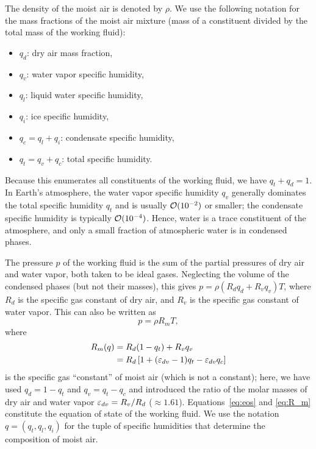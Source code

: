 \documentclass{report}
\begin{document}
The density of the moist air is denoted by $\rho$. We use the following notation for the mass fractions of the moist air mixture (mass of a constituent divided by the total mass of the working fluid):
\begin{itemize}
\item $q_d$: dry air mass fraction,
\item $q_v$: water vapor specific humidity,
\item $q_l$: liquid water specific humidity,
\item $q_i$: ice specific humidity,
\item $q_c = q_l + q_i$: condensate specific humidity,
\item $q_t = q_v + q_c$: total specific humidity.
\end{itemize}
Because this enumerates all constituents of the working fluid, we have $q_t + q_d = 1$. In Earth's atmosphere, the water vapor specific humidity $q_v$ generally dominates the total specific humidity $q_t$ and is usually $\mathcal{O}(10^{-2})$ or smaller; the condensate specific humidity is typically $\mathcal{O}(10^{-4})$. Hence, water is a trace constituent of the atmosphere, and only a small fraction of atmospheric water is in condensed phases. 

The pressure $p$ of the working fluid is the sum of the partial pressures of dry air and water vapor, both taken to be ideal gases. Neglecting the volume of the condensed phases (but not their masses), this gives $p = \rho (R_d q_d + R_v q_v) T$, where $R_d$ is the specific gas constant of dry air, and $R_v$ is the specific gas constant of water vapor. This can also be written as
\begin{equation}
    p = \rho R_m T,
\label{eq:eos}
\end{equation}
where
\begin{equation}
\begin{split}
    R_m(q) & = R_d (1 - q_t) + R_v q_v \\
        & = R_d \left[1 + (\varepsilon_{dv}-1)q_t - \varepsilon_{dv} q_c\right]
\label{eq:R_m}
\end{split}
\end{equation}
is the specific gas ``constant'' of moist air (which is not a constant); here, we have used $q_d = 1-q_t$ and $q_v = q_t - q_c$ and introduced the ratio of the molar masses of dry air and water vapor $\varepsilon_{dv} = R_v/R_d$ ($\approx 1.61$). Equations~\eqref{eq:eos} and \eqref{eq:R_m} constitute the equation of state of the working fluid. We use the notation $q=(q_t, q_l, q_i)$ for the tuple of specific humidities that determine the composition of moist air.
\end{document}
